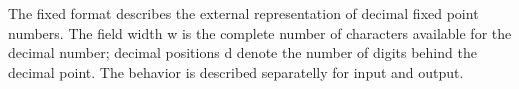 



The fixed format describes the external representation of decimal fixed
point numbers. The field width w is the complete number of characters
available for the decimal number; decimal positions d denote the number
of digits behind the decimal point. 
The behavior is described separatelly for input and output.

